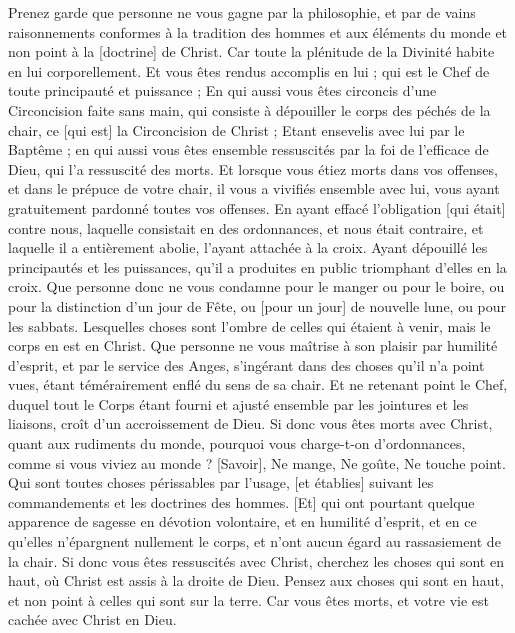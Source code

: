 \begin{multicols}{2}
Prenez garde que personne ne vous gagne par la philosophie, et par de vains raisonnements conformes à la tradition des hommes et aux éléments du monde et non point à la [doctrine] de Christ.
Car toute la plénitude de la Divinité habite en lui corporellement.
Et vous êtes rendus accomplis en lui ; qui est le Chef de toute principauté et puissance ;
En qui aussi vous êtes circoncis d'une Circoncision faite sans main, qui consiste à dépouiller le corps des péchés de la chair, ce [qui est] la Circoncision de Christ ;
Etant ensevelis avec lui par le Baptême ; en qui aussi vous êtes ensemble ressuscités par la foi de l'efficace de Dieu, qui l'a ressuscité des morts.
Et lorsque vous étiez morts dans vos offenses, et dans le prépuce de votre chair, il vous a vivifiés ensemble avec lui, vous ayant gratuitement pardonné toutes vos offenses.
En ayant effacé l'obligation [qui était] contre nous, laquelle consistait en des ordonnances, et nous était contraire, et laquelle il a entièrement abolie, l'ayant attachée à la croix.
Ayant dépouillé les principautés et les puissances, qu'il a produites en public triomphant d'elles en la croix.
Que personne donc ne vous condamne pour le manger ou pour le boire, ou pour la distinction d'un jour de Fête, ou [pour un jour] de nouvelle lune, ou pour les sabbats.
Lesquelles choses sont l'ombre de celles qui étaient à venir, mais le corps en est en Christ.
Que personne ne vous maîtrise à son plaisir par humilité d'esprit, et par le service des Anges, s'ingérant dans des choses qu'il n'a point vues, étant témérairement enflé du sens de sa chair.
Et ne retenant point le Chef, duquel tout le Corps étant fourni et ajusté ensemble par les jointures et les liaisons, croît d'un accroissement de Dieu.
Si donc vous êtes morts avec Christ, quant aux rudiments du monde, pourquoi vous charge-t-on d'ordonnances, comme si vous viviez au monde ?
[Savoir], Ne mange, Ne goûte, Ne touche point.
Qui sont toutes choses périssables par l'usage, [et établies] suivant les commandements et les doctrines des hommes.
[Et] qui ont pourtant quelque apparence de sagesse en dévotion volontaire, et en humilité d'esprit, et en ce qu'elles n'épargnent nullement le corps, et n'ont aucun égard au rassasiement de la chair.
\VerseOne{}Si donc vous êtes ressuscités avec Christ, cherchez les choses qui sont en haut, où Christ est assis à la droite de Dieu.
Pensez aux choses qui sont en haut, et non point à celles qui sont sur la terre.
Car vous êtes morts, et votre vie est cachée avec Christ en Dieu.

\end{multicols}
